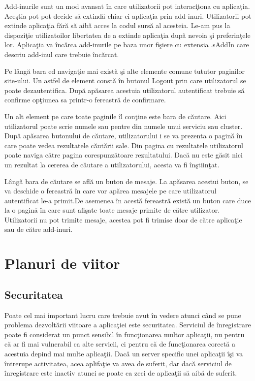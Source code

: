 \documentclass[a4paper,12pt]{report}
\begin{document}
Add-inurile sunt un mod avansat \^in care utilizatorii pot interac\c itona cu aplica\c tia. Ace\c stia 
pot pot decide s\u a extind\u a chiar ei aplica\c tia prin add-inuri. Utilizatorii pot extinde aplica\c tia 
f\u ar\u a s\u a aib\u a acces la codul surs\u a al acesteia. Le-am pus la dispozi\c tie utilizatoilor libertatea de a extinde 
aplica\c tia dup\u a nevoia \c si preferin\c tele lor. Aplica\c tia va \^inc\u arca add-inurile pe baza unor 
fi\c siere cu extensia .sAddIn care descriu add-inul care trebuie \^inc\u arcat.

Pe l\^ang\u a bara ed naviga\c tie mai exist\u a \c si alte elemente comune 
tututor paginilor site-ului. Un astfel de element const\u a \^in butonul Logout 
prin care utilizatorul se poate dezautentifica. Dup\u a ap\u asarea acestuia 
utilizatorul autentificat trebuie s\u a confirme op\c tiunea sa printr-o 
fereastr\u a de confirmare.

Un alt element pe care toate paginile \^il con\c tine este bara de c\u autare.
Aici utilizatorul poate scrie numele sau pentre din numele unui serviciu sau cluster.
Dup\u a ap\u asarea butonului de c\u autare, utilizatorului i se va prezenta o pagin\u a 
\^in care poate vedea rezultatele c\u aut\u arii sale. Din pagina cu rezultatele 
utilizatorul poate naviga c\u atre pagina corespunz\u atoare rezultatului.
Dac\u a nu este g\u asit nici un rezultat la cererea de c\u autare a utilizatorului,
acesta va fi \^in\c stiin\c tat.

L\^ang\u a bara de c\u autare se afl\u a un buton de mesaje. La ap\u asarea acestui buton,
se va deschide o fereastr\u a \^in care vor ap\u area mesajele pe care utilizatorul 
autentificat le-a primit.De asemenea \^in acest\u a fereastr\u a exist\u a un buton care 
duce la o pagin\u a \^in care sunt afi\c sate toate mesaje primite de c\u atre utilizator.
Utilizatorii nu pot trimite mesaje, acestea pot fi trimise doar de c\u atre aplica\c tie sau de 
c\u atre add-inuri.

\chapter{Planuri de viitor}

\section{Securitatea}

Poate cel mai important lucru care trebuie avut \^in vedere atunci c\^and se pune problema  
dezvolt\u arii viitoare a aplica\c tiei este securitatea. Serviciul de \^inregistrare 
poate fi considerat un punct sensibil \^in func\c tionarea multor aplica\c tii, nu pentru c\u a 
ar fi mai vulnerabil ca alte servicii, ci pentru c\u a de func\c tionarea corect\u a a acestuia 
depind mai multe aplica\c tii. Dac\u a un server specific unei aplica\c tii \^i\c si va \^intrerupe 
activitatea, acea aplifa\c tie va avea de suferit, dar dac\u a serviciul de \^inregistrare este inactiv 
atunci se poate ca zeci de aplica\c tii s\u a aib\u a de suferit. 
\end{document}
